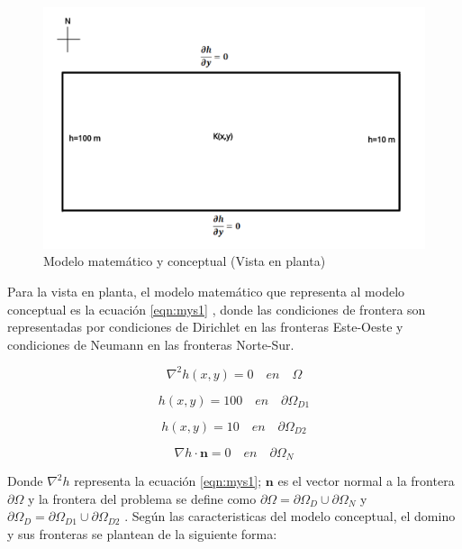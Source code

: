  \begin{figure}[H]
\centering
\includegraphics[scale=0.35]{Figura_25c.png}
\caption{ Modelo matemático y conceptual (Vista en planta)}
\label{Figura20:2}
\end{figure}

Para la vista en planta, el modelo matemático que representa al modelo conceptual es la ecuación \ref{eqn:mys1} , donde las condiciones de frontera son representadas por condiciones de Dirichlet en las fronteras Este-Oeste y condiciones de Neumann en las fronteras Norte-Sur.

 \begin{equation}
 \label{eqn:mys3}
 \nabla^{2}h(x,y)=0 \quad en \quad \Omega
\end{equation} 

\begin{equation}
 \label{eqn:mys4}
 h(x,y)=100 \quad en \quad {\partial}{\Omega}_{D1}
\end{equation}

\begin{equation}
 \label{eqn:mys4a}
 h(x,y)=10 \quad en \quad {\partial}{\Omega}_{D2}
\end{equation}
 
\begin{equation}
 \label{eqn:mys5}
  {\nabla}h{\cdot}\textbf{n}=0 \quad en \quad {\partial}{\Omega}_{N} 
\end{equation}  

Donde ${\nabla}^{2}h$ representa la ecuación \ref{eqn:mys1}; $\textbf{n}$ es el vector normal a la frontera ${\partial}\Omega$ y la frontera del problema se define como ${\partial}\Omega={\partial}\Omega_{D}{\cup}{\partial}\Omega_{N}$ y ${\partial}{\Omega}_{D}={\partial}\Omega_{D1}{\cup}{\partial}\Omega_{D2}$  . Según las caracteristicas del modelo conceptual, el domino y sus fronteras se plantean de la siguiente forma:

